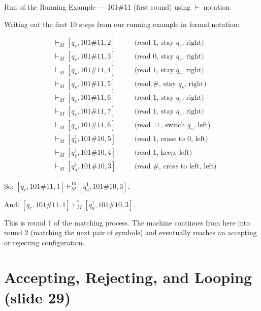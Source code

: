 \documentclass[11pt,a4paper]{article}
\begin{document}
\begin{examplebox}{Run of the Running Example --- 101\#11 (first round) using $\vdash$ notation}

Writing out the first 10 steps from our running example in formal notation:

\begin{align*}
[q_r, 101\#11, 1] &\vdash_M [q_r, 101\#11, 2] &\quad &\text{(read 1, stay $q_r$, right)} \\
                   &\vdash_M [q_r, 101\#11, 3] &\quad &\text{(read 0, stay $q_r$, right)} \\
                   &\vdash_M [q_r, 101\#11, 4] &\quad &\text{(read 1, stay $q_r$, right)} \\
                   &\vdash_M [q_r, 101\#11, 5] &\quad &\text{(read \#, stay $q_r$, right)} \\
                   &\vdash_M [q_r, 101\#11, 6] &\quad &\text{(read 1, stay $q_r$, right)} \\
                   &\vdash_M [q_r, 101\#11, 7] &\quad &\text{(read 1, stay $q_r$, right)} \\
                   &\vdash_M [q_s, 101\#11, 6] &\quad &\text{(read $\sqcup$, switch $q_s$, left)} \\
                   &\vdash_M [q_\ell^1, 101\#10, 5] &\quad &\text{(read 1, erase to 0, left)} \\
                   &\vdash_M [q_\ell^1, 101\#10, 4] &\quad &\text{(read 1, keep, left)} \\
                   &\vdash_M [q_a^1, 101\#10, 3] &\quad &\text{(read \#, cross to left, left)}
\end{align*}

So: $[q_r, 101\#11, 1] \vdash_M^{10} [q_a^1, 101\#10, 3]$.

And: $[q_r, 101\#11, 1] \vdash_M^* [q_a^1, 101\#10, 3]$.

This is round 1 of the matching process. The machine continues from here into round 2 (matching the next pair of symbols) and eventually reaches an accepting or rejecting configuration.
\end{examplebox}


\newpage
\section{Accepting, Rejecting, and Looping (slide 29)}
\end{document}
